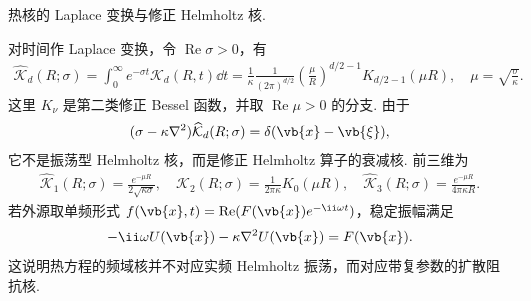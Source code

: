 \begin{exbox}
	热核的 Laplace 变换与修正 Helmholtz 核.
	
	对时间作 Laplace 变换，令 \(\operatorname{Re}\sigma>0\)，有
	\begin{align*}
		\widehat{\mathcal{K}}_d(R;\sigma)
		=\int_0^\infty e^{-\sigma t}\mathcal{K}_d(R,t)\dd t
		=\frac{1}{\kappa}\frac{1}{(2\pi)^{d/2}}
		\left(\frac{\mu}{R}\right)^{d/2-1}K_{d/2-1}(\mu R),
		\quad
		\mu=\sqrt{\frac{\sigma}{\kappa}}.
	\end{align*}
	这里 \(K_\nu\) 是第二类修正 Bessel 函数，并取 \(\operatorname{Re}\mu>0\) 的分支. 由于
	\begin{align*}
		(\sigma-\kappa\nabla^2)\widehat{\mathcal{K}}_d(R;\sigma)=\delta(\vb{x}-\vb{\xi}),
	\end{align*}
	它不是振荡型 Helmholtz 核，而是修正 Helmholtz 算子的衰减核. 前三维为
	\begin{align*}
		\widehat{\mathcal{K}}_1(R;\sigma)=\frac{e^{-\mu R}}{2\sqrt{\kappa\sigma}},
		\quad
		\widehat{\mathcal{K}}_2(R;\sigma)=\frac{1}{2\pi\kappa}K_0(\mu R),
		\quad
		\widehat{\mathcal{K}}_3(R;\sigma)=\frac{e^{-\mu R}}{4\pi\kappa R}.
	\end{align*}
	若外源取单频形式 \(f(\vb{x},t)=\operatorname{Re}(F(\vb{x})e^{-\ii\omega t})\)，稳定振幅满足
	\begin{align*}
		-\ii\omega U(\vb{x})-\kappa\nabla^2U(\vb{x})=F(\vb{x}).
	\end{align*}
	这说明热方程的频域核并不对应实频 Helmholtz 振荡，而对应带复参数的扩散阻抗核.
\end{exbox}
